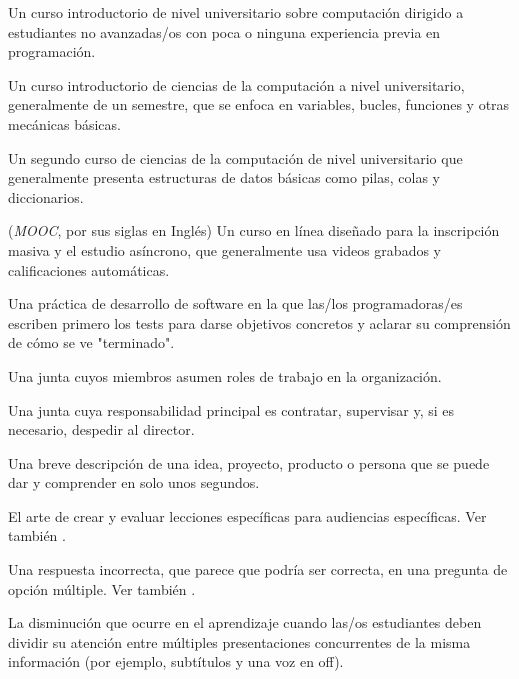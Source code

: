 \begin{description}
 Un curso introductorio de nivel universitario sobre computación
dirigido a estudiantes no avanzadas/os con poca o ninguna experiencia previa en programación.

 Un curso introductorio de ciencias de la computación a nivel universitario,
generalmente de un semestre, que se enfoca en variables, bucles, funciones y otras mecánicas básicas.

 Un segundo curso de ciencias de la computación de nivel universitario
que generalmente presenta estructuras de datos básicas como pilas, colas y diccionarios.

 (\emph{MOOC}, por sus siglas en Inglés) Un curso en línea diseñado para la inscripción masiva y el estudio asíncrono, que generalmente usa videos grabados y calificaciones automáticas.

 Una práctica de desarrollo
de software en la que las/los programadoras/es escriben primero los tests
para darse objetivos concretos y aclarar su comprensión de cómo se ve "terminado".

 Una junta cuyos miembros asumen roles de trabajo en la organización.

 Una junta cuya responsabilidad principal es
contratar, supervisar y, si es necesario, despedir al director.

 Una breve descripción de una idea,
proyecto, producto o persona que se puede dar y comprender en solo unos segundos.

 El arte de crear y evaluar
lecciones específicas para audiencias específicas. Ver también
.

 Una respuesta incorrecta, que parece que podría ser correcta, en una pregunta de opción múltiple. Ver también
.

 La disminución que ocurre
en el aprendizaje cuando las/os estudiantes deben dividir su atención entre múltiples presentaciones concurrentes de la misma información (por ejemplo, subtítulos y una voz en off).


\end{description}
